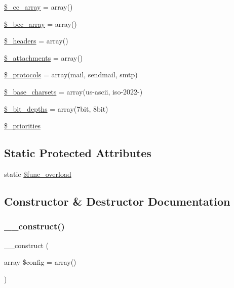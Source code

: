 \begin{DoxyCompactItemize}
\mbox{\hyperlink{class_c_i___email_af979b4b8dc11cd847482938c13fd527d}{\$\+\_\+cc\+\_\+array}} = array()
\item 
\mbox{\hyperlink{class_c_i___email_a9e55a2ff848d216fa27361d3c66d979d}{\$\+\_\+bcc\+\_\+array}} = array()
\item 
\mbox{\hyperlink{class_c_i___email_a1481ae63a7fb295087c3a668a0359500}{\$\+\_\+headers}} = array()
\item 
\mbox{\hyperlink{class_c_i___email_a36f182452832f13cf40ab24ee9ffce90}{\$\+\_\+attachments}} = array()
\item 
\mbox{\hyperlink{class_c_i___email_a67dcd847790518bf5fbe6576a0c11c04}{\$\+\_\+protocols}} = array(\textquotesingle{}mail\textquotesingle{}, \textquotesingle{}sendmail\textquotesingle{}, \textquotesingle{}smtp\textquotesingle{})
\item 
\mbox{\hyperlink{class_c_i___email_a212a02e70f089ba2e1a29bd6f45b0691}{\$\+\_\+base\+\_\+charsets}} = array(\textquotesingle{}us-\/ascii\textquotesingle{}, \textquotesingle{}iso-\/2022-\/\textquotesingle{})
\item 
\mbox{\hyperlink{class_c_i___email_a65b779b2385490a293d286a135bdf00c}{\$\+\_\+bit\+\_\+depths}} = array(\textquotesingle{}7bit\textquotesingle{}, \textquotesingle{}8bit\textquotesingle{})
\item 
\mbox{\hyperlink{class_c_i___email_af2e56ba04b214aad41be6db88e729645}{\$\+\_\+priorities}}
\end{DoxyCompactItemize}
\subsection*{Static Protected Attributes}
\begin{DoxyCompactItemize}
\item 
static \mbox{\hyperlink{class_c_i___email_aef84be58d58a5895572c5689e56a1047}{\$func\+\_\+overload}}
\end{DoxyCompactItemize}


\subsection{Constructor \& Destructor Documentation}
\mbox{\label{class_c_i___email_a35018c0dc92a448db5c4686364ced754}} 
\subsubsection{\texorpdfstring{\+\_\+\+\_\+construct()}{\_\_construct()}}
{\footnotesize\ttfamily \+\_\+\+\_\+construct (\begin{DoxyParamCaption}\item[{array}]{\$config = {\ttfamily array()} }\end{DoxyParamCaption})}

